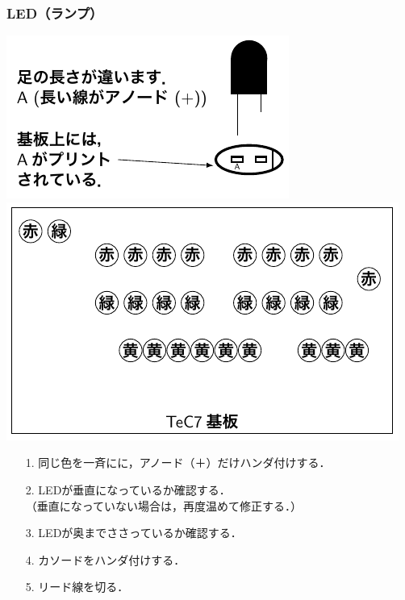 \documentclass[handout]{beamer}        %
\begin{document}
\begin{frame}
  \frametitle{LED（ランプ）}
  \vfill
  \centerline{\includegraphics[scale=0.65]{../Tikz/leds.pdf}\hspace{2cm}
    \includegraphics[scale=0.65]{../Tikz/leds2.pdf}}
  \vfill
  \begin{enumerate}
    \item[1.] 同じ色を一斉にに，アノード（＋）だけハンダ付けする．
    \item[2.] LEDが垂直になっているか確認する．\\
      （垂直になっていない場合は，再度温めて修正する．）
    \item[3.] LEDが奥までささっているか確認する．
    \item[4.] カソードをハンダ付けする．
    \item[5.] リード線を切る．
  \end{enumerate}
  \vfill
\end{frame}
\end{document}
